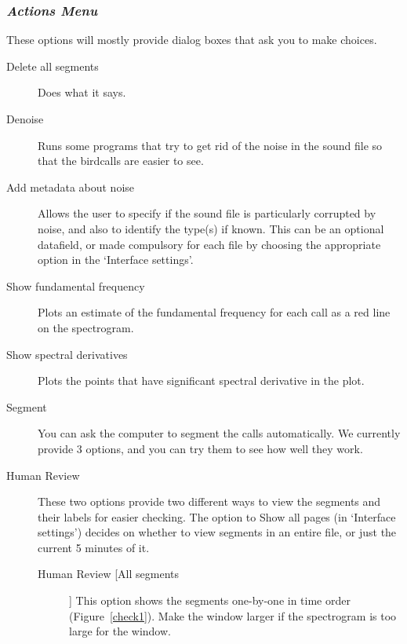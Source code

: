 \documentclass{article}
\begin{document}
\subsubsection{{\em Actions Menu}}
\label{sec:action}

These options will mostly provide dialog boxes that ask you to make choices. 

\begin{description}
\item [Delete all segments] Does what it says. 
\item [Denoise] Runs some programs that try to get rid of the noise in the sound file so that the birdcalls are easier to see. 
\item [Add metadata about noise] Allows the user to specify if the sound file is particularly corrupted by noise, and also to identify the type(s) if known. This can be an optional datafield, or made compulsory for each file by choosing the appropriate option in the `Interface settings'.
\item [Show fundamental frequency] Plots an estimate of the fundamental frequency for each call as a red line on the spectrogram.
\item [Show spectral derivatives] Plots the points that have significant spectral derivative in the plot.
\item [Segment] You can ask the computer to segment the calls automatically. 
We currently provide 3 options, and you can try them to see how well they work.
\item [Human Review] These two options provide two different ways to view the segments and their labels for easier checking. The option to Show all pages (in `Interface settings') decides on whether to view segments in an entire file, or just the current 5 minutes of it. 
	\begin{description}
	\item [Human Review [All segments]] This option shows the segments one-by-one in time order (Figure~\ref{check1}). Make the window larger if the spectrogram is too large for the window. 
	\begin{figure}
	\centering

\end{figure}
\end{description}
\end{description}
\end{document}
